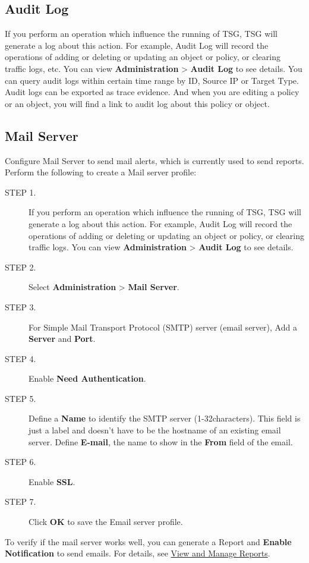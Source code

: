 \subsection*{\hypertarget{link:Audit Log}{Audit Log}}
\label{sec:intro:admin:audit}

If you perform an operation which influence the running of TSG, TSG will generate a log about this action. 
For example, Audit Log will record the operations of adding or deleting or updating an object or policy, or clearing traffic logs, etc. 
You can view \textbf{Administration} > \textbf{Audit Log} to see details. You can query audit logs within certain time range by ID, Source IP or Target Type. 
Audit logs can be exported as trace evidence. And when you are editing a policy or an object, you will find a link to audit log about this policy or object.

\subsection*{\hypertarget{link:Mail Server}{Mail Server}}
\label{sec:intro:admin:mail}

Configure Mail Server to send mail alerts, which is currently used to send reports. Perform the following to create a Mail server profile:


\begin{description}
    \item[STEP 1.]	If you perform an operation which influence the running of TSG, TSG will generate a log about this action. 
    For example, Audit Log will record the operations of adding or deleting or updating an object or policy, or clearing traffic logs. 
    You can view \textbf{Administration} > \textbf{Audit Log} to see details.
    \item[STEP 2.]	Select \textbf{Administration} > \textbf{Mail Server}.
    \item[STEP 3.]	For Simple Mail Transport Protocol (SMTP) server (email server), Add a \textbf{Server} and \textbf{Port}.    
    \item[STEP 4.]	Enable \textbf{Need Authentication}.
    \item[STEP 5.]	Define a \textbf{Name} to identify the SMTP server (1-32characters). This field is just a label and doesn’t have to be the hostname of an existing email server. 
    Define \textbf{E-mail}, the name to show in the \textbf{From} field of the email.
    \item[STEP 6.]	Enable \textbf{SSL}. 
    \item[STEP 7.]	Click \textbf{OK} to save the Email server profile.
\end{description}


To verify if the mail server works well, you can generate a Report and \textbf{Enable Notification} to send emails. For details, see \hyperlink{link:View and Manage Reports}{\textcolor{linkblue}{View and Manage Reports}}.


